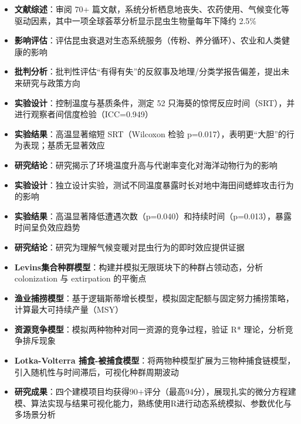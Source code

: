 \documentclass{my-resume}
\begin{document}
\begin{itemize}[parsep=0.2ex]
  \item \textbf{文献综述}：审阅 70+ 篇文献，系统分析栖息地丧失、农药使用、气候变化等驱动因素，其中一项全球荟萃分析显示昆虫生物量每年下降约 2.5\%
  \item \textbf{影响评估}：评估昆虫衰退对生态系统服务（传粉、养分循环）、农业和人类健康的影响
  \item \textbf{批判分析}：批判性评估“有得有失”的反叙事及地理/分类学报告偏差，提出未来研究与政策方向
\end{itemize}

\begin{itemize}[parsep=0.2ex]
  \item \textbf{实验设计}：控制温度与基质条件，测定 52 只海葵的惊愕反应时间（SRT），并进行观察者间信度检验（ICC=0.949）
  \item \textbf{实验结果}：高温显著缩短 SRT（Wilcoxon 检验 p=0.017），表明更“大胆”的行为表现；基质无显著效应
  \item \textbf{研究结论}：研究揭示了环境温度升高与代谢率变化对海洋动物行为的影响
\end{itemize}

\begin{itemize}[parsep=0.2ex]
  \item \textbf{实验设计}：独立设计实验，测试不同温度暴露时长对地中海田间蟋蟀攻击行为的影响
  \item \textbf{实验结果}：高温显著降低遭遇次数（p=0.040）和持续时间（p=0.013），暴露时间呈负效应趋势
  \item \textbf{研究结论}：研究为理解气候变暖对昆虫行为的即时效应提供证据
\end{itemize}

\begin{itemize}[parsep=0.2ex]
  \item \textbf{Levins集合种群模型}：构建并模拟无限斑块下的种群占领动态，分析 colonization 与 extirpation 的平衡点
  \item \textbf{渔业捕捞模型}：基于逻辑斯蒂增长模型，模拟固定配额与固定努力捕捞策略，计算最大可持续产量（MSY）
  \item \textbf{资源竞争模型}：模拟两种物种对同一资源的竞争过程，验证 R* 理论，分析竞争排斥现象
  \item \textbf{Lotka-Volterra 捕食-被捕食模型}：将两物种模型扩展为三物种捕食链模型，引入随机性与时间滞后，可视化种群周期波动
  \item \textbf{研究成果}：四个建模项目均获得90+评分（最高94分），展现扎实的微分方程建模、算法实现与结果可视化能力，熟练使用R进行动态系统模拟、参数优化与多场景分析
\end{itemize}
\end{document}
